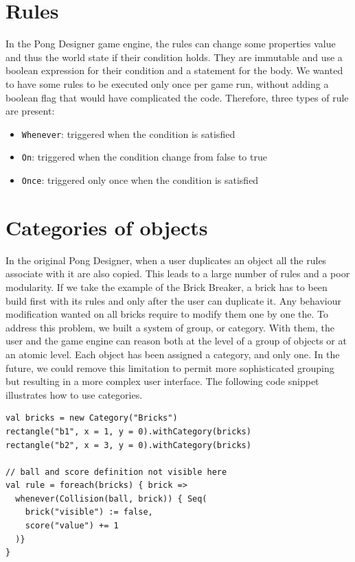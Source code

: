 \documentclass[11pt,a4paper]{article}
\begin{document}
\section{Rules}
In the Pong Designer game engine, the rules can change some properties value and thus the world state if their condition holds. They are immutable and use a boolean expression for their condition and a statement for the body. We wanted to have some rules to be executed only once per game run, without adding a boolean flag that would have complicated the code. Therefore, three types of rule are present:
\begin{itemize}[noitemsep,topsep=2pt,parsep=1pt,partopsep=1pt]
\item \texttt{Whenever}: triggered when the condition is satisfied
\item \texttt{On}: triggered when the condition change from false to true
\item \texttt{Once}: triggered only once when the condition is satisfied
\end{itemize}

\section{Categories of objects}
In the original Pong Designer, when a user duplicates an object all the rules associate with it are also copied. This leads to a large number of rules and a poor modularity. If we take the example of the Brick Breaker, a brick has to been build first with its rules and only after the user can duplicate it. Any behaviour modification wanted on all bricks require to modify them one by one the. To address this problem, we built a system of group, or category. With them, the user and the game engine can reason both at the level of a group of objects or at an atomic level. Each object has been assigned a category, and only one. In the future, we could remove this limitation to permit more sophisticated grouping but resulting in a more complex user interface. The following code snippet illustrates how to use categories. 

\begin{lstlisting}
val bricks = new Category("Bricks")
rectangle("b1", x = 1, y = 0).withCategory(bricks)
rectangle("b2", x = 3, y = 0).withCategory(bricks)

// ball and score definition not visible here
val rule = foreach(bricks) { brick =>
  whenever(Collision(ball, brick)) { Seq(
    brick("visible") := false, 
    score("value") += 1
  )}
}
\end{lstlisting}
\end{document}
